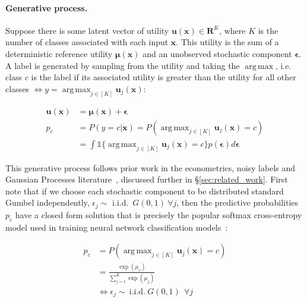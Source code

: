 \documentclass[final]{cvpr}
\DeclareMathOperator*{\argmax}{arg\,max}
\begin{document}
\paragraph{Generative process.}

Suppose there is some latent vector of utility $\mathbf{u}(\mathbf{x}) \in \mathbf{R}^K$, where  $K$ is the number of classes associated with each input $\mathbf{x}$.
This utility is the sum of a deterministic reference utility $\boldsymbol{\mu}(\mathbf{x})$ and an unobserved stochastic component $\boldsymbol{\epsilon}$. A label is generated by sampling from the utility and taking the $\argmax$, i.e. class $c$ is the label if its associated utility is greater than the utility for all other classes $\iff y = \argmax_{j \in [K]} \mathbf{u}_j(\mathbf{x})$:

\begin{equation}
\begin{split}
    \mathbf{u}(\mathbf{x}) &= \boldsymbol{\mu}(\mathbf{x}) + \boldsymbol{\epsilon} \\
    p_c &= P(y = c | \mathbf{x}) = P(\argmax_{j \in [K]} \mathbf{u}_j(\mathbf{x}) = c) \\
    &= \int \mathds{1}\Big\{\argmax_{j \in [K]} \mathbf{u}_j(\mathbf{x}) = c\Big\} p(\boldsymbol{\epsilon}) d\boldsymbol{\epsilon}
\end{split}
\label{eq:latent_variable_model}
\end{equation}

This generative process follows prior work in the econometrics, noisy labels and Gaussian Processes literature~\cite{train2009discrete,kendall2017uncertainties,collier2020analysis,hernandez2014mind,williams2006gaussian}, discussed further in \S \ref{sec:related_work}. First note that if we choose each stochastic component to be distributed standard Gumbel independently, $\epsilon_j \sim$ i.i.d.\ $\mathit{G}(0,1) \ \forall j$, then the predictive probabilities $p_c$ have a closed form solution that is precisely the popular softmax cross-entropy model used in training neural network classification models~\cite{train2009discrete,collier2020analysis}: 

\begin{equation}
\begin{split}
    p_c &= P(\argmax_{j \in [K]} \mathbf{u}_j(\mathbf{x}) = c) \\
    &=  \frac{\exp(\mu_c)}{\sum_{j=1}^K \exp(\mu_j)} \\
    & \iff \epsilon_j \sim \ \text{i.i.d.}\ \mathit{G}(0,1) \ \ \forall j
\end{split}
\label{eq:softmax_cross_entropy}
\end{equation}
\end{document}
